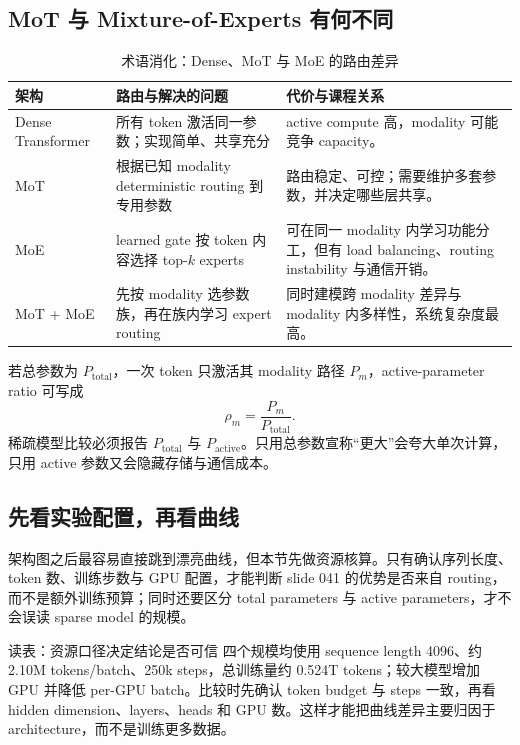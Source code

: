 \subsection{MoT 与 Mixture-of-Experts 有何不同}

\begin{table}[H]
\centering
\small
\begin{tabularx}{0.98\textwidth}{L{0.17\textwidth}Y Y}
\toprule
架构 & 路由与解决的问题 & 代价与课程关系 \\
\midrule
Dense Transformer & 所有 token 激活同一参数；实现简单、共享充分 & active compute 高，modality 可能竞争 capacity。 \\
MoT & 根据已知 modality deterministic routing 到专用参数 & 路由稳定、可控；需要维护多套参数，并决定哪些层共享。 \\
MoE & learned gate 按 token 内容选择 top-$k$ experts & 可在同一 modality 内学习功能分工，但有 load balancing、routing instability 与通信开销。 \\
MoT + MoE & 先按 modality 选参数族，再在族内学习 expert routing & 同时建模跨 modality 差异与 modality 内多样性，系统复杂度最高。 \\
\bottomrule
\end{tabularx}
\caption{术语消化：Dense、MoT 与 MoE 的路由差异}
\end{table}

若总参数为 $P_{\text{total}}$，一次 token 只激活其 modality 路径 $P_{m}$，active-parameter ratio 可写成
$$
\rho_m=\frac{P_m}{P_{\text{total}}}.
$$
稀疏模型比较必须报告 $P_{\text{total}}$ 与 $P_{\text{active}}$。只用总参数宣称“更大”会夸大单次计算，只用 active 参数又会隐藏存储与通信成本。

\subsection{先看实验配置，再看曲线}

架构图之后最容易直接跳到漂亮曲线，但本节先做资源核算。只有确认序列长度、token 数、训练步数与 GPU 配置，才能判断 slide 041 的优势是否来自 routing，而不是额外训练预算；同时还要区分 total parameters 与 active parameters，才不会误读 sparse model 的规模。


\begin{knowledgebox}{读表：资源口径决定结论是否可信}
四个规模均使用 sequence length 4096、约 2.10M tokens/batch、250k steps，总训练量约 0.524T tokens；较大模型增加 GPU 并降低 per-GPU batch。比较时先确认 token budget 与 steps 一致，再看 hidden dimension、layers、heads 和 GPU 数。这样才能把曲线差异主要归因于 architecture，而不是训练更多数据。
\end{knowledgebox}

